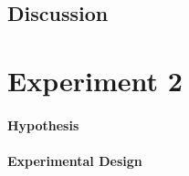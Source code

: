 \documentclass[a4]{article}
\begin{document}




\subsection{Discussion}


\section{Experiment 2}

\paragraph{Hypothesis} %


\paragraph{Experimental Design} 


\end{document}
